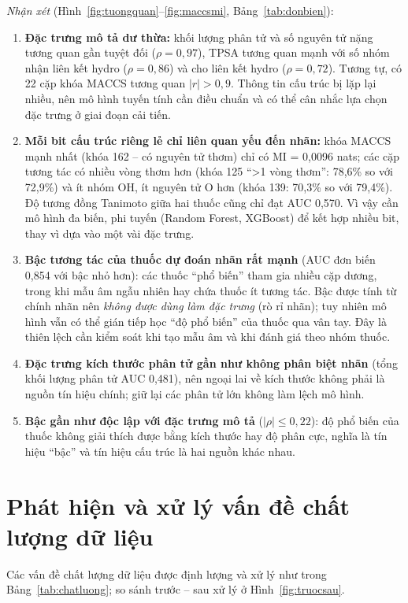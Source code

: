 \documentclass[12pt,a4paper,oneside]{report}
\begin{document}
\textit{Nhận xét} (Hình~\ref{fig:tuongquan}--\ref{fig:maccsmi}, Bảng~\ref{tab:donbien}):
\begin{enumerate}
  \item \textbf{Đặc trưng mô tả dư thừa:} khối lượng phân tử và số nguyên tử nặng
        tương quan gần tuyệt đối ($\rho=0{,}97$), TPSA tương quan mạnh với số nhóm
        nhận liên kết hydro ($\rho=0{,}86$) và cho liên kết hydro ($\rho=0{,}72$).
        Tương tự, có 22 cặp khóa MACCS tương quan $|r|>0{,}9$. Thông tin cấu trúc
        bị lặp lại nhiều, nên mô hình tuyến tính cần điều chuẩn và có thể cân
        nhắc lựa chọn đặc trưng ở giai đoạn cải tiến.
  \item \textbf{Mỗi bit cấu trúc riêng lẻ chỉ liên quan yếu đến nhãn:} khóa MACCS
        mạnh nhất (khóa 162 -- có nguyên tử thơm) chỉ có MI = 0,0096 nats; các cặp
        tương tác có nhiều vòng thơm hơn (khóa 125 ``>1 vòng thơm'': 78,6\% so
        với 72,9\%) và ít nhóm OH, ít nguyên tử O hơn (khóa 139: 70,3\% so với
        79,4\%). Độ tương đồng Tanimoto giữa hai thuốc cũng chỉ đạt AUC 0,570.
        Vì vậy cần mô hình đa biến, phi tuyến (Random Forest, XGBoost) để kết hợp
        nhiều bit, thay vì dựa vào một vài đặc trưng.
  \item \textbf{Bậc tương tác của thuốc dự đoán nhãn rất mạnh} (AUC đơn biến 0,854
        với bậc nhỏ hơn): các thuốc ``phổ biến'' tham gia nhiều cặp dương, trong
        khi mẫu âm ngẫu nhiên hay chứa thuốc ít tương tác. Bậc được tính từ chính
        nhãn nên \emph{không được dùng làm đặc trưng} (rò rỉ nhãn); tuy nhiên mô
        hình vẫn có thể gián tiếp học ``độ phổ biến'' của thuốc qua vân tay. Đây là
        thiên lệch cần kiểm soát khi tạo mẫu âm và khi đánh giá theo nhóm thuốc.
  \item \textbf{Đặc trưng kích thước phân tử gần như không phân biệt nhãn} (tổng
        khối lượng phân tử AUC 0,481), nên ngoại lai về kích thước không phải là
        nguồn tín hiệu chính; giữ lại các phân tử lớn không làm lệch mô hình.
  \item \textbf{Bậc gần như độc lập với đặc trưng mô tả} ($|\rho|\leq0{,}22$): độ
        phổ biến của thuốc không giải thích được bằng kích thước hay độ phân cực,
        nghĩa là tín hiệu ``bậc'' và tín hiệu cấu trúc là hai nguồn khác nhau.
\end{enumerate}

\section{Phát hiện và xử lý vấn đề chất lượng dữ liệu}
\label{sec:chatluong}
Các vấn đề chất lượng dữ liệu được định lượng và xử lý như trong
Bảng~\ref{tab:chatluong}; so sánh trước -- sau xử lý ở Hình~\ref{fig:truocsau}.
\end{document}
